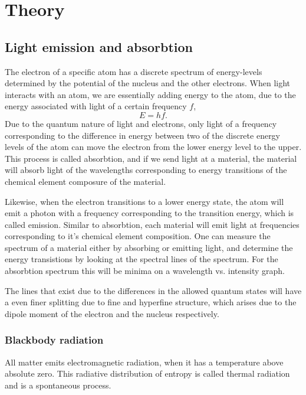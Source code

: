 \section{Theory}
\subsection{Light emission and absorbtion}

The electron of a specific atom has a discrete spectrum of energy-levels
determined by the potential of the nucleus and the other electrons. When light
interacts with an atom, we are essentially adding energy to the atom, due to
the energy associated with light of a certain frequency $f$,
\begin{equation}
E=hf.
\end{equation} 
Due to the quantum nature of light and electrons, only light of a frequency
corresponding to the difference in energy between two of the discrete energy
levels of the atom can move the electron from the lower energy level to the upper. This process is called absorbtion, and if we send light at a material, the material will absorb light of the wavelengths corresponding to energy transitions of the chemical element composure of the material.

Likewise, when the electron transitions to a lower energy state, the atom will
emit a photon with a frequency corresponding to the transition energy, which is
called emission. Similar to absorbtion, each material will emit light at
frequencies corresponding to it's chemical element composition. One can measure
the spectrum of a material either by absorbing or emitting light, and determine the energy transistions by looking at the spectral lines of the spectrum. For the absorbtion spectrum this will be minima on a wavelength vs. intensity graph. 

The lines that exist due to the differences in the allowed quantum states will have a even finer splitting due to fine and hyperfine structure, which arises due to the dipole moment of the electron and the nucleus respectively. 


\subsubsection{Blackbody radiation}
All matter emits electromagnetic radiation, when it has a temperature above absolute zero. This radiative distribution of entropy is called thermal radiation and is a spontaneous process.

